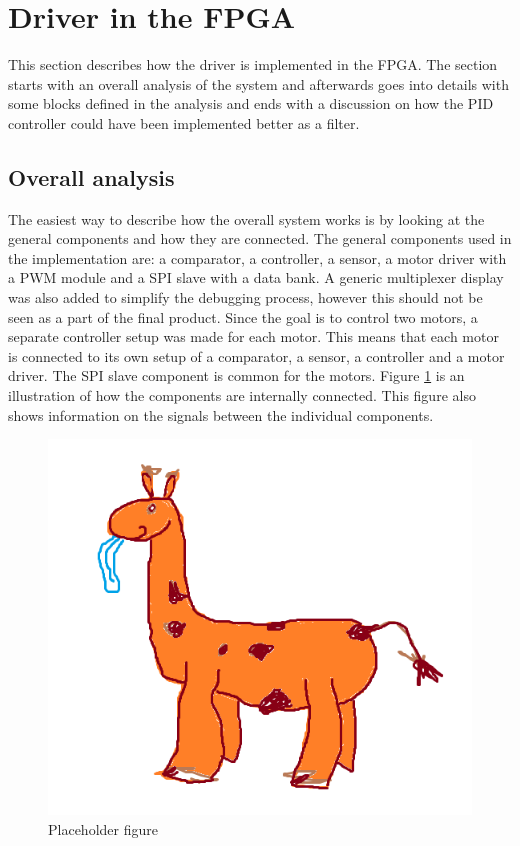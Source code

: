 \section{Driver in the FPGA}
This section describes how the driver is implemented in the FPGA. The section starts with an overall analysis of the system and afterwards goes into details with some blocks defined in the analysis and ends with a discussion on how the PID controller could have been implemented better as a filter.

\subsection{Overall analysis}

The easiest way to describe how the overall system works is by looking at the general components and how they are connected. The general components used in the implementation are: a comparator, a controller, a sensor, a motor driver with a PWM module and a SPI slave with a data bank. A generic multiplexer display was also added to simplify the debugging process, however this should not be seen as a part of the final product.
Since the goal is to control two motors, a separate controller setup was made for each motor. This means that each motor is connected to its own setup of a comparator, a sensor, a controller and a motor driver. The SPI slave component is common for the motors.
Figure \ref{fig:IDEA_WEIGHT_v2} is an illustration of how the components are internally connected. This figure also shows information on the signals between the individual components.

\newpage
\begin{figure}[h!]
\centering
\includegraphics[scale=0.5]{billeder/IDEA_WEIGHT_v2.png}
\caption{ Placeholder figure }
\label{fig:IDEA_WEIGHT_v2}
\end{figure}
\newpage

